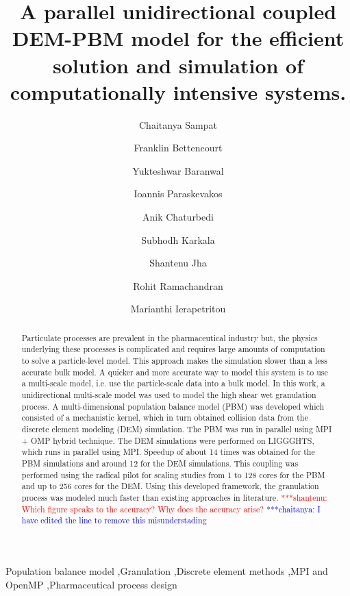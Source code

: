 \documentclass[preprint,11pt,authoryear]{elsarticle}
\newcommand{\jhanote}[1]{ {\textcolor{red} { ***shantenu: #1 }}}
\newcommand{\csnote}[1]{ {\textcolor{blue} { ***chaitanya: #1 }}}
\newcommand{\jhanote}[1]{}
\newcommand{\csnote}[1]{}
\begin{document}
\begin{frontmatter}

\title{A parallel unidirectional coupled DEM-PBM model for the efficient solution and simulation of 
computationally  intensive systems.}
\author[add1]{Chaitanya Sampat}
\author[add1]{Franklin Bettencourt}
\author[add1]{Yukteshwar Baranwal}
\author[add2]{Ioannis Paraskevakos}
\author[add1]{Anik Chaturbedi}
\author[add1]{Subhodh Karkala}
\author[add2]{Shantenu Jha}
\author[add1]{Rohit Ramachandran}
\author[add1]{Marianthi Ierapetritou}
\address[add1]{Department of Chemical and Biochemical Engineering, Rutgers, The State University of New
Jersey, Piscataway, NJ, USA-08854}
\address[add2]{Electrical and Computer Engineering, Rutgers, The State University of New Jersey, 
Piscataway, NJ, USA-08854}

\begin{abstract}
Particulate processes are prevalent in the pharmaceutical industry but, the 
physics underlying these processes is complicated and requires large amounts
of computation to solve a particle-level model. This approach makes the
simulation slower than a less accurate bulk model. A quicker
and more accurate way to model this system is to use a multi-scale model, 
i.e. use the particle-scale data into a bulk model. In this work, a
unidirectional multi-scale model was used to model the high shear wet
granulation process. A multi-dimensional population balance model (PBM) was
developed which consisted of a mechanistic kernel, which in turn obtained 
collision data from the discrete element modeling (DEM) simulation. The PBM
was run in parallel using MPI + OMP hybrid technique. The DEM simulations were
performed on LIGGGHTS, which runs in parallel using MPI. Speedup of about 14
times was obtained for the PBM simulations and around 12 for the DEM
simulations. This coupling was performed using the radical pilot for scaling
studies from 1 to 128 cores for the PBM and up to 256 cores for the DEM. Using
this developed framework, the granulation process was modeled 
much faster than existing approaches in literature. \jhanote{Which figure
speaks to the accuracy? Why does the accuracy arise?} \csnote{I have edited the line to remove this misunderstading}
\end{abstract}
\begin{keyword}
Population balance model \sep Granulation \sep Discrete element methods  \sep MPI and OpenMP 
\sep Pharmaceutical process design
\end{keyword}
\end{frontmatter}
\linenumbers
\end{document}
